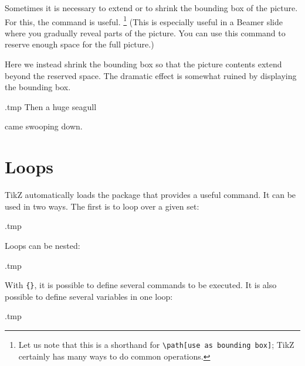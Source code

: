 Sometimes it is necessary to extend or to shrink the bounding box of the picture.
For this, the  command is useful.%
\footnote{Let us note that this is a shorthand for
\texttt{\textbackslash{}path[use as bounding box]};
TikZ certainly has many ways to do common operations.}
(This is especially useful in a Beamer slide where you gradually reveal parts of the picture.
You can use this command to reserve enough space for the full picture.)

Here we instead shrink the bounding box
so that the picture contents extend beyond the reserved space.
The dramatic effect is somewhat ruined by displaying the bounding box.
%
\begin{VerbatimOut}{\jobname.tmp}
\centering
Then a huge seagull
came swooping down.
\end{VerbatimOut}
\ShowExampleBelow[2]



%
%
\section{Loops}\label{sec:pgffor}

TikZ automatically loads the  package that provides a useful  command.
It can be used in two ways.
The first is to loop over a given set:
%
\begin{VerbatimOut}{\jobname.tmp}
\centering
{}
\end{VerbatimOut}
\ShowExampleBelow[2]
%
Loops can be nested:
%
\begin{VerbatimOut}{\jobname.tmp}
\centering
{}
\end{VerbatimOut}
\ShowExampleBelow[2]
With \verb|{}|, it is possible to define several commands to be executed.
It is also possible to define several variables in one loop:
%
\begin{VerbatimOut}{\jobname.tmp}
\centering
{}
\end{VerbatimOut}
\ShowExampleBelow[2]

